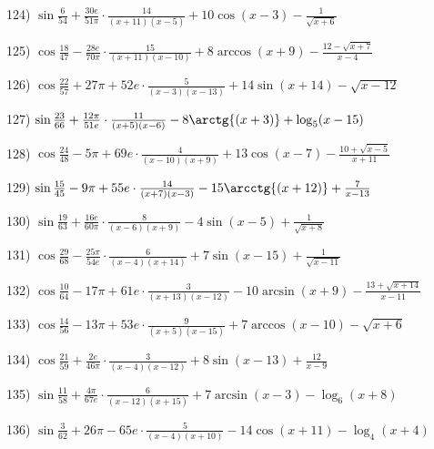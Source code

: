 \documentclass[11pt,ukrainian]{article}
\begin{document}
124) \space 
{ ${\sin\frac{6}{54}} + \frac{30 e}{51{\pi}}\cdot {\frac{14}{(x + 11)(x - 5)}} + {10\cos{(x - 3)}} - {\frac{1}{\sqrt{x + 6}}}$}
\smallskip\par
125) \space 
{ ${\cos\frac{18}{47}} - \frac{28 e}{70{\pi}}\cdot {\frac{15}{(x + 11)(x - 10)}} + {8\arccos{(x + 9)}} - {\frac{12 - \sqrt{x + 7}}{x - 4}}$}
\smallskip\par
126) \space 
{ ${\cos\frac{22}{57}} + 27{\pi} + 52 e\cdot {\frac{5}{(x - 3)(x - 13)}} + {14\sin{(x + 14)}} - {\sqrt{x - 12}}$}
\smallskip\par
127) \space 
{ ${\sin\frac{23}{66}} + \frac{12{\pi}}{51 e}\cdot {\frac{11}{(x + 5)(x - 6)}} - {8\arctg{(x + 3)}} + {\log_{5}(x - 15)}$}
\smallskip\par
128) \space 
{ ${\cos\frac{24}{48}} - 5{\pi} + 69 e\cdot {\frac{4}{(x - 10)(x + 9)}} + {13\cos{(x - 7)}} - {\frac{10 + \sqrt{x - 5}}{x + 11}}$}
\smallskip\par
129) \space 
{ ${\sin\frac{15}{45}} - 9{\pi} + 55 e\cdot {\frac{14}{(x + 7)(x - 3)}} - {15\arcctg{(x + 12)}} + { \frac{7}{x - 13}}$}
\smallskip\par
130) \space 
{ ${\sin\frac{19}{63}} + \frac{16 e}{60{\pi}}\cdot {\frac{8}{(x - 6)(x + 9)}} - {4\sin{(x - 5)}} + {\frac{1}{\sqrt{x + 8}}}$}
\smallskip\par
131) \space 
{ ${\cos\frac{29}{68}} - \frac{25{\pi}}{54 e}\cdot {\frac{6}{(x - 4)(x + 14)}} + {7\sin{(x - 15)}} + {\frac{1}{\sqrt{x - 11}}}$}
\smallskip\par
132) \space 
{ ${\cos\frac{10}{64}} - 17{\pi} + 61 e\cdot {\frac{3}{(x + 13)(x - 12)}} - {10\arcsin{(x + 9)}} - {\frac{13 + \sqrt{x + 14}}{x - 11}}$}
\smallskip\par
133) \space 
{ ${\cos\frac{14}{56}} - 13{\pi} + 53 e\cdot {\frac{9}{(x + 5)(x - 15)}} + {7\arccos{(x - 10)}} - {\sqrt{x + 6}}$}
\smallskip\par
134) \space 
{ ${\cos\frac{21}{59}} + \frac{2 e}{46{\pi}}\cdot {\frac{3}{(x - 4)(x - 12)}} + {8\sin{(x - 13)}} + { \frac{12}{x - 9}}$}
\smallskip\par
135) \space 
{ ${\sin\frac{11}{58}} + \frac{4{\pi}}{67 e}\cdot {\frac{6}{(x - 12)(x + 15)}} + {7\arcsin{(x - 3)}} - {\log_{6}(x + 8)}$}
\smallskip\par
136) \space 
{ ${\sin\frac{3}{62}} + 26{\pi} - 65 e\cdot {\frac{5}{(x - 4)(x + 10)}} - {14\cos{(x + 11)}} - {\log_{4}(x + 4)}$}
\end{document}
